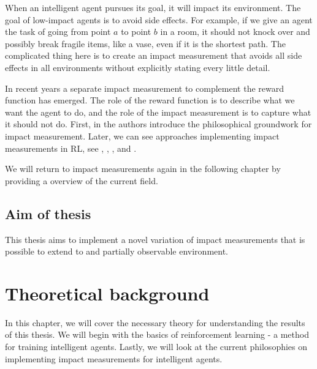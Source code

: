 \documentclass[12pt,A4]{report}
\newcommand{\autobaj}{}
\theoremstyle{definition}
\begin{document}
When an intelligent agent pursues its goal, it will impact its environment. The goal of low-impact agents is to avoid side effects. For example, if we give an agent the task of going from point $a$ to point $b$ in a room, it should not knock over and possibly break fragile items, like a vase, even if it is the shortest path. The complicated thing here is to create an impact measurement that avoids all side effects in all environments without explicitly stating every little detail.

In recent years a separate impact measurement to complement the reward function has emerged. The role of the reward function is to describe what we want the agent to do, and the role of the impact measurement is to capture what it should not do. First, in \citet{ArmstrongLevinstein} the authors introduce the philosophical groundwork for impact measurement. Later, we can see approaches implementing impact measurements in RL, see \citet{Eysenbach}, \citet{Krakovna19}, \citet{Turner19}, and \citet{Krakovna20}.

We will return to impact measurements again in the following chapter by providing a overview of the current field. 

\section{Aim of thesis}
This thesis aims to implement a novel variation of impact measurements that is possible to extend to and partially observable environment.


 


\chapter{Theoretical background}
In this chapter, we will cover the necessary theory for understanding the results of this thesis. We will begin with the basics of reinforcement learning - a method for training intelligent agents. Lastly, we will look at the current philosophies on implementing impact measurements for intelligent agents. 
\end{document}
